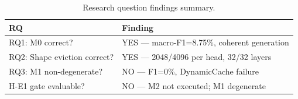 \begin{table}[h]
\centering
\caption{Research question findings summary.}
\label{tab:rq_summary}
\begin{tabular}{ll}
\toprule
RQ & Finding \\
\midrule
RQ1: M0 correct? & YES --- macro-F1=8.75\%, coherent generation \\
RQ2: Shape eviction correct? & YES --- 2048/4096 per head, 32/32 layers \\
RQ3: M1 non-degenerate? & NO --- F1=0\%, DynamicCache failure \\
H-E1 gate evaluable? & NO --- M2 not executed; M1 degenerate \\
\bottomrule
\end{tabular}
\end{table}
